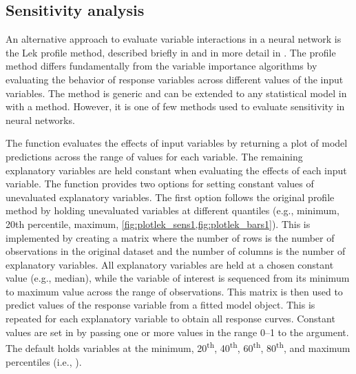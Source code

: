 \documentclass[article,shortnames]{jss}\usepackage[]{graphicx}\usepackage[]{color}
\begin{document}
\subsection{Sensitivity analysis}

An alternative approach to evaluate variable interactions in a neural network is the Lek profile method, described briefly in \citet{Lek96} and in more detail in \citet{Gevrey03}. The profile method differs fundamentally from the variable importance algorithms by evaluating the behavior of response variables across different values of the input variables. The method is generic and can be extended to any statistical model in  with a  method. However, it is one of few methods used to evaluate sensitivity in neural networks.  

The  function evaluates the effects of input variables by returning a plot of model predictions across the range of values for each variable.  The remaining explanatory variables are held constant when evaluating the effects of each input variable.  The  function provides two options for setting constant values of unevaluated explanatory variables.  The first option follows the original profile method by holding unevaluated variables at different quantiles (e.g., minimum, 20th percentile, maximum, \cref{fig:plotlek_sens1,fig:plotlek_bars1}). This is implemented by creating a matrix where the number of rows is the number of observations in the original dataset and the number of columns is the number of explanatory variables. All explanatory variables are held at a chosen constant value (e.g., median), while the variable of interest is sequenced from its minimum to maximum value across the range of observations. This matrix is then used to predict values of the response variable from a fitted model object. This is repeated for each explanatory variable to obtain all response curves.  Constant values are set in  by passing one or more values in the range 0--1 to the  argument.  The default holds variables at the minimum, 20\textsuperscript{th}, 40\textsuperscript{th}, 60\textsuperscript{th}, 80\textsuperscript{th}, and maximum percentiles (i.e., ).  
\end{document}
